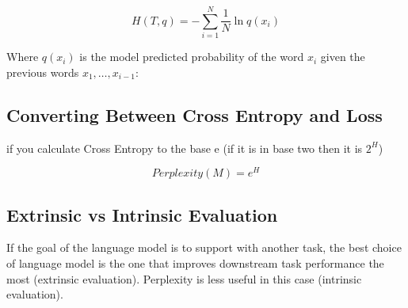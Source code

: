 \documentclass[11pt]{article}
\begin{document}
    
\begin{definition}
    \begin{equation*}
        H(T,q) = - \sum^N_{i=1} \frac 1 N \ln q(x_i)    
    \end{equation*}

    Where $q(x_i)$ is the model predicted probability of the word $x_i$ given the previous words $x_1, \ldots, x_{i-1}$:
\end{definition}

\subsection{Converting Between Cross Entropy and Loss}

if you calculate Cross Entropy to the base e (if it is in base two then it is $2^H$)

\begin{equation*}
    Perplexity(M) = e^H 
\end{equation*}

\subsection{Extrinsic vs Intrinsic Evaluation}

If the goal of the language model is to support with another task, the best choice of language model is the one that improves downstream task performance the most (extrinsic evaluation). Perplexity is less useful in this case (intrinsic evaluation).

\printbibliography
{}
\end{document}

